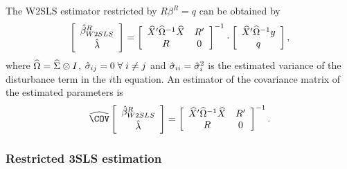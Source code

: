 The W2SLS estimator restricted by $R \beta^R = q$ can be obtained by
\begin{equation}
   \left[ \begin{array}{c}
      \hat{\beta}^R_{W2SLS} \\[0.2em] \hat{\lambda}
   \end{array} \right]
   =
   \left[ \begin{array}{cc}
      \widehat{X}' \widehat{\Omega}^{-1} \widehat{X} & R' \\
      R & 0
   \end{array} \right]^{-1}
   \cdot
   \left[ \begin{array}{c}
      \widehat{X}' \widehat{\Omega}^{-1} y \\ q
   \end{array} \right] ,
\end{equation}
where $\widehat{\Omega} = \widehat{\Sigma} \otimes I$,
$\hat{\sigma}_{ij} = 0 \; \forall \; i \neq j$ and
$\hat{\sigma}_{ii} = \hat{\sigma}_i^2$ is the estimated variance
of the disturbance term in the $i$th equation.
An estimator of the covariance matrix of the estimated parameters is
\begin{equation}
   \COVHat
   \left[ \begin{array}{c}
      \bHat^R_{W2SLS} \\[0.2em] \lHat
   \end{array} \right] 
   = 
   \left[ \begin{array}{cc}
      \XHat' \OHat^{-1} \XHat & R' \\
      R & 0
   \end{array} \right]^{-1} .
\end{equation}


\subsubsection{Restricted 3SLS estimation}

